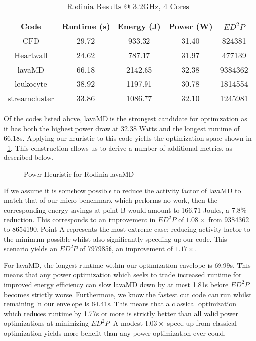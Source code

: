 \begin{table}
\centering
\small
\begin{tabular}{@{}ccccc@{}} \toprule
Code & Runtime (s) & Energy (J) & Power (W) & $ED^2P$ \\ \midrule 
CFD & 29.72 & 933.32 & 31.40 & 824381  \\ 
Heartwall & 24.62 & 787.17 & 31.97 & 477139 \\ 
lavaMD & 66.18 & 2142.65 & 32.38 & 9384362\\ 
leukocyte &  38.92 & 1197.91 & 30.78 & 1814554 \\ 
streamcluster & 33.86 & 1086.77 & 32.10 & 1245981 \\ 
\bottomrule
\end{tabular}
   \vspace{0.5\baselineskip}
\caption{Rodinia Results @ 3.2GHz, 4 Cores}
\label{tab:coderesults}
\end{table} 

Of the codes listed above, lavaMD is the strongest candidate for optimization as it has both the highest power draw at 32.38 Watts and the longest runtime of 66.18s. Applying our heuristic to this code yields the optimization space shown in \figurename~\ref{fig:lavamd}. This construction allows us to derive a number of additional metrics, as described below.


\begin{figure}

\caption{Power Heuristic for Rodinia lavaMD} \label{fig:lavamd}
\end{figure}

If we assume it is somehow possible to reduce the activity factor of lavaMD to match that of our  micro-benchmark which performs no work, then the corresponding energy savings at point B would amount to 166.71 Joules, a $7.8\%$ reduction. This corresponds to an improvement in $ED^2P$ of $1.08\times$ from 9384362 to 8654190. Point A represents the most extreme case; reducing activity factor to the minimum possible whilst also significantly speeding up our code. This scenario yields an $ED^2P$ of 7979856, an improvement of $1.17\times$.

For lavaMD, the longest runtime within our optimization envelope is 69.99s. This means that any power optimization which seeks to trade increased runtime for improved energy efficiency can slow lavaMD down by at most 1.81s before $ED^2P$ becomes strictly worse. Furthermore, we know the fastest out code can run whilst remaining in our envelope is 64.41s. This means that a classical optimization which reduces runtime by 1.77s or more is strictly better than all valid power optimizations at minimizing $ED^2P$. A modest $1.03\times$ speed-up from classical optimization yields more benefit than any power optimization ever could.

